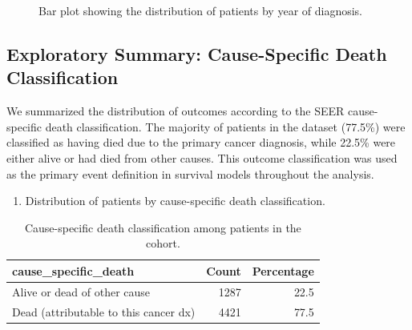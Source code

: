 \documentclass[
  letterpaper,
  DIV=11,
  numbers=noendperiod]{scrartcl}
\providecommand{\tightlist}{%
  \setlength{\itemsep}{0pt}\setlength{\parskip}{0pt}}\usepackage{longtable,booktabs,array}
\begin{document}
\begin{figure}


\caption{\label{fig-year-diagnosis}Bar plot showing the distribution of
patients by year of diagnosis.}

\end{figure}%

\subsection{Exploratory Summary: Cause-Specific Death
Classification}\label{exploratory-summary-cause-specific-death-classification}

We summarized the distribution of outcomes according to the SEER
cause-specific death classification. The majority of patients in the
dataset (77.5\%) were classified as having died due to the primary
cancer diagnosis, while 22.5\% were either alive or had died from other
causes. This outcome classification was used as the primary event
definition in survival models throughout the analysis.

\begin{enumerate}
\def\labelenumi{\arabic{enumi}.}
\setcounter{enumi}{1}
\tightlist
\item
  Distribution of patients by cause-specific death classification.
\end{enumerate}

\begin{longtable}[]{@{}lrr@{}}

\caption{\label{tbl-cause-death}Cause-specific death classification
among patients in the cohort.}

\tabularnewline

\toprule\noalign{}
cause\_specific\_death & Count & Percentage \\
\midrule\noalign{}
\endhead
\bottomrule\noalign{}
\endlastfoot
Alive or dead of other cause & 1287 & 22.5 \\
Dead (attributable to this cancer dx) & 4421 & 77.5 \\

\end{longtable}
\end{document}
